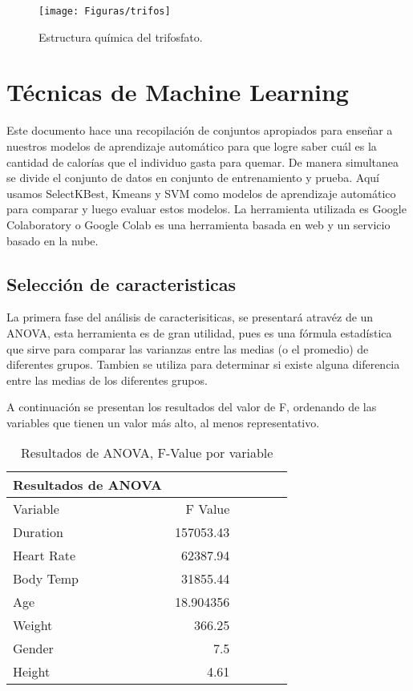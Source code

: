 \documentclass[5p,times,authoryear]{sciarticle}
\begin{document}
\begin{multicols}{2}
\begin{figure}[H]
\centering
  \texttt{[image: Figuras/trifos]}\\
  \caption{Estructura química del trifosfato.}\label{fig1}
\end{figure}

\section{Técnicas de Machine Learning}
Este documento hace una recopilación de conjuntos apropiados para enseñar a nuestros modelos de aprendizaje automático para que logre
saber cuál es la cantidad de calorías que el individuo gasta para quemar. De manera simultanea se divide el conjunto de datos en conjunto de entrenamiento y prueba. Aquí usamos SelectKBest, Kmeans y SVM como modelos de aprendizaje automático para comparar y luego evaluar estos modelos. La herramienta utilizada es Google Colaboratory o Google Colab es una herramienta basada en web y un servicio basado en la nube.

\subsection{Selección de caracteristicas}


La primera fase del análisis de caracterisiticas, se presentará atravéz de un ANOVA, esta herramienta es de gran utilidad, pues es una fórmula estadística que sirve para comparar las varianzas entre las medias (o el promedio) de diferentes grupos. Tambien se utiliza para determinar si existe alguna diferencia entre las medias de los diferentes grupos.

A continuación se presentan los resultados del valor de F, ordenando de las variables que tienen un valor más alto, al menos representativo.



\begin{table}[H]
  \caption{Resultados de ANOVA, F-Value por variable}
   \label{extremos45}
  \begin{tabular*}{\hsize}{lrrrrr}
\hline
Resultados de ANOVA\\
   \hline
Variable & F Value \\
Duration & 157053.43 \\
Heart Rate &  62387.94 \\
Body Temp & 31855.44 \\
Age	 &	18.904356\\
Weight & 366.25  \\
Gender & 7.5 \\
Height & 4.61 \\
\hline
  \end{tabular*}
\end{table}


\end{multicols}
\end{document}
